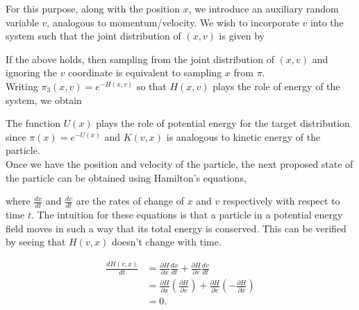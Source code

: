 \documentclass[letterpaper,english,10pt]{article}
\begin{document}
For this purpose, along with the position $x$, we introduce an auxiliary random variable $v$, analogous to momentum/velocity. We wish to incorporate $v$ into the system such that the joint distribution of $(x,v)$ is given by


If the above holds, then sampling from the joint distribution of $(x,v)$ and ignoring the $v$ coordinate is equivalent to sampling $x$ from $\pi$.\\

Writing $\pi_3(x,v) = e^{-H(x,v)}$ so that $H(x,v)$ plays the role of energy of the system, we obtain


The function $U(x)$ plays the role of potential energy for the target distribution since $\pi(x) = e^{-U(x)}$ and $K(v,x)$ is analogous to kinetic energy of the particle.\\

Once we have the position and velocity of the particle, the next proposed state of the particle can be obtained using Hamilton's equations,


where $\frac{dx}{dt}$ and $\frac{dv}{dt}$ are the rates of change of $x$ and $v$ respectively with respect to time $t$. The intuition for these equations is that a particle in a potential energy field moves in such a way that its total energy is conserved. This can be verified by seeing that $H(v,x)$ doesn't change with time.

\begin{align*}
\frac{dH(v,x)}{dt} &= \frac{\partial H}{\partial x} \frac{dx}{dt} + \frac{\partial H}{\partial v} \frac{dv}{dt} \\
	&= \frac{\partial H}{\partial x} \left( \frac{\partial H}{\partial v} \right) + \frac{\partial H}{\partial v} \left( - \frac{\partial H}{\partial x} \right) \\
	&= 0.
\end{align*}
\end{document}
